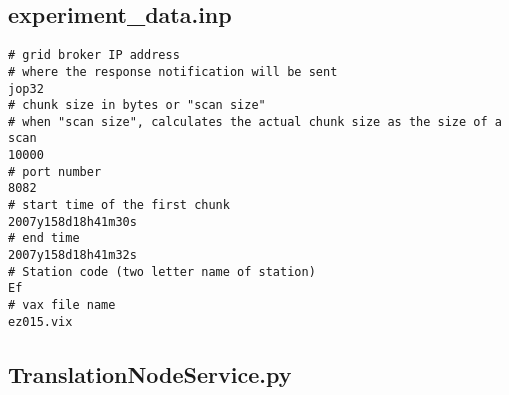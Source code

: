 \subsection{experiment\_data.inp}
\begin{verbatim}
# grid broker IP address
# where the response notification will be sent
jop32
# chunk size in bytes or "scan size"
# when "scan size", calculates the actual chunk size as the size of a scan 
10000
# port number
8082
# start time of the first chunk
2007y158d18h41m30s
# end time
2007y158d18h41m32s
# Station code (two letter name of station)
Ef
# vax file name
ez015.vix
\end{verbatim} 

\subsection{TranslationNodeService.py}
